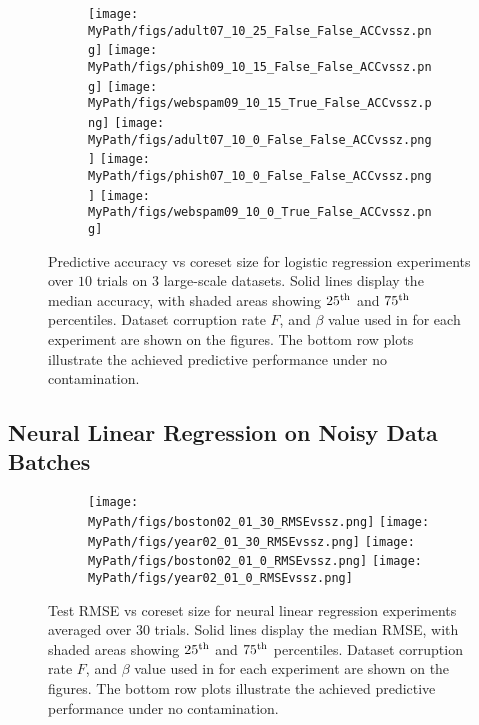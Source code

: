 \begin{figure}[t!]
	\begin{subfigure}[b]{0.9\textwidth} 
		\centering
		\texttt{[image: \\MyPath/figs/adult07\_10\_25\_False\_False\_ACCvssz.png]}
		\centering
		\hfill
		\texttt{[image: \\MyPath/figs/phish09\_10\_15\_False\_False\_ACCvssz.png]}
		\centering
		\hfill
		\texttt{[image: \\MyPath/figs/webspam09\_10\_15\_True\_False\_ACCvssz.png]}
		\centering
		\texttt{[image: \\MyPath/figs/adult07\_10\_0\_False\_False\_ACCvssz.png]}
		\centering
		\hfill
		\texttt{[image: \\MyPath/figs/phish07\_10\_0\_False\_False\_ACCvssz.png]}
		\centering
		\hfill
		\texttt{[image: \\MyPath/figs/webspam09\_10\_0\_True\_False\_ACCvssz.png]}
	\end{subfigure}	
	\centering
	\caption{Predictive accuracy vs coreset size for logistic regression experiments over $10$ trials on $3$ large-scale datasets. Solid lines display the median accuracy, with shaded areas showing $25\textsuperscript{th}$ and $75\textsuperscript{th}$ percentiles. Dataset corruption rate $F$, and $\beta$ value used in \bcores{} for each experiment are shown on the figures. The bottom row plots illustrate the achieved predictive performance under no contamination.}
	\label{fig:logreg_plot}
\end{figure}


\subsection{Neural Linear Regression on Noisy Data Batches}
\label{subsec:neur-linr-expt}

\begin{figure}[t!]
	\begin{subfigure}[b]{0.9\textwidth} 
		\centering
		\texttt{[image: \\MyPath/figs/boston02\_01\_30\_RMSEvssz.png]}
		\hfill
		\texttt{[image: \\MyPath/figs/year02\_01\_30\_RMSEvssz.png]}
		\centering
		\hfill
		\texttt{[image: \\MyPath/figs/boston02\_01\_0\_RMSEvssz.png]}
		\centering
		\hfill
		\texttt{[image: \\MyPath/figs/year02\_01\_0\_RMSEvssz.png]}
	\end{subfigure}	
	\centering
	\caption{Test RMSE vs coreset size for neural linear regression experiments averaged over 30 trials. Solid lines display the median RMSE, with shaded areas showing $25\textsuperscript{th}$ and $75\textsuperscript{th}$ percentiles. Dataset corruption rate $F$, and $\beta$ value used in \bcores{} for each experiment are shown on the figures. The bottom row plots illustrate the achieved predictive performance under no contamination.}
	\label{fig:neural_plot}
\end{figure}

